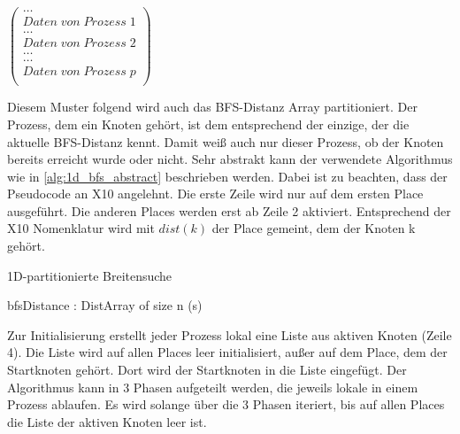 \begin{center}
$\left( \begin{array}{c}
	\dots \\ Daten\;von\;Prozess\;1 \\	\hline
	\dots \\ Daten\;von\;Prozess\;2 \\	\hline
	\dots \\	\hline
	\dots \\ Daten\;von\;Prozess\;p \\
\end{array} \right)$
\end{center}

Diesem Muster folgend wird auch das BFS-Distanz Array partitioniert. Der Prozess, dem ein Knoten gehört, ist dem entsprechend der einzige, der die aktuelle BFS-Distanz kennt. Damit weiß auch nur dieser Prozess, ob der Knoten bereits erreicht wurde oder nicht. Sehr abstrakt kann der verwendete Algorithmus wie in \ref{alg:1d_bfs_abstract} beschrieben werden. Dabei ist zu beachten, dass der Pseudocode an X10 angelehnt. Die erste Zeile wird nur auf dem ersten Place ausgeführt. Die anderen Places werden erst ab Zeile 2 aktiviert. Entsprechend der X10 Nomenklatur wird mit $dist(k)$ der Place gemeint, dem der Knoten k gehört.

\begin{algorithm}
	\caption{1D-partitionierte Breitensuche}
	\label{alg:1d_bfs_abstract}
	\begin{algorithmic}[1]
		\State bfsDistance : DistArray of size n 
			(s) 
					\EndFor
				\EndFor

					\EndIf
				\EndFor
			\EndWhile
		\EndFor
	\end{algorithmic}
\end{algorithm}

Zur Initialisierung erstellt jeder Prozess lokal eine Liste aus aktiven Knoten (Zeile 4). Die Liste wird auf allen Places leer initialisiert, außer auf dem Place, dem der Startknoten gehört. Dort wird der Startknoten in die Liste eingefügt. Der Algorithmus kann in 3 Phasen aufgeteilt werden, die jeweils lokale in einem Prozess ablaufen. Es wird solange über die 3 Phasen iteriert, bis auf allen Places die Liste der aktiven Knoten leer ist.


